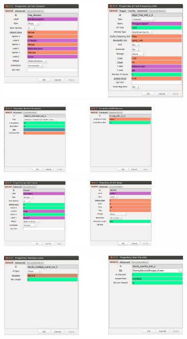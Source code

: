 \documentclass[12pt,a4paper]{article}
\begin{document}
\begin{figure}[hbt!]
\centering
	\includegraphics[width=0.85\textwidth ]{Bilder/Aufgabe1-properties2.png}
\end{figure}


\begin{figure}[hbt!]
\centering
	\includegraphics[width=0.7\textwidth ]{Bilder/Aufgabe1-properties3.png}
\end{figure}


\begin{figure}[hbt!]
\centering
	\includegraphics[width=0.7\textwidth ]{Bilder/Aufgabe1-properties4.png}
\end{figure}
\clearpage

\begin{figure}[hbt!]
\centering
	\includegraphics[width=0.85\textwidth ]{Bilder/Aufgabe1-properties5.png}
\end{figure}
\end{document}
